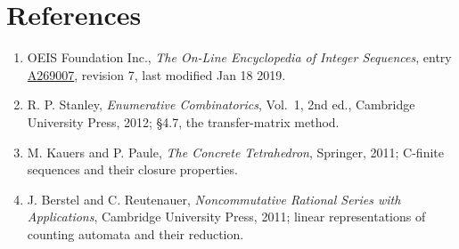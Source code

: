 \documentclass[11pt]{article}
\theoremstyle{definition}
\begin{document}
\section{References}

\begin{enumerate}

\item OEIS Foundation Inc., \emph{The On-Line Encyclopedia of Integer Sequences}, entry \href{https://oeis.org/A269007}{A269007}, revision 7, last modified Jan 18 2019.

\item R. P. Stanley, \emph{Enumerative Combinatorics}, Vol.~1, 2nd ed., Cambridge University Press, 2012; \S4.7, the transfer-matrix method.

\item M. Kauers and P. Paule, \emph{The Concrete Tetrahedron}, Springer, 2011; C-finite sequences and their closure properties.

\item J. Berstel and C. Reutenauer, \emph{Noncommutative Rational Series with Applications}, Cambridge University Press, 2011; linear representations of counting automata and their reduction.

\end{enumerate}
\end{document}
